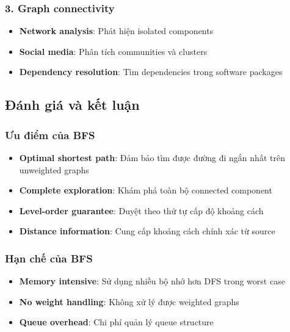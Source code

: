 \documentclass[12pt]{article}
\begin{document}
\subsubsection*{3. Graph connectivity}
\begin{itemize}
    \item \textbf{Network analysis}: Phát hiện isolated components
    \item \textbf{Social media}: Phân tích communities và clusters
    \item \textbf{Dependency resolution}: Tìm dependencies trong software packages
\end{itemize}

\subsection*{Đánh giá và kết luận}

\subsubsection*{Ưu điểm của BFS}
\begin{itemize}
    \item \textbf{Optimal shortest path}: Đảm bảo tìm được đường đi ngắn nhất trên unweighted graphs
    \item \textbf{Complete exploration}: Khám phá toàn bộ connected component
    \item \textbf{Level-order guarantee}: Duyệt theo thứ tự cấp độ khoảng cách
    \item \textbf{Distance information}: Cung cấp khoảng cách chính xác từ source
\end{itemize}

\subsubsection*{Hạn chế của BFS}
\begin{itemize}
    \item \textbf{Memory intensive}: Sử dụng nhiều bộ nhớ hơn DFS trong worst case
    \item \textbf{No weight handling}: Không xử lý được weighted graphs
    \item \textbf{Queue overhead}: Chi phí quản lý queue structure
\end{itemize}
\end{document}
